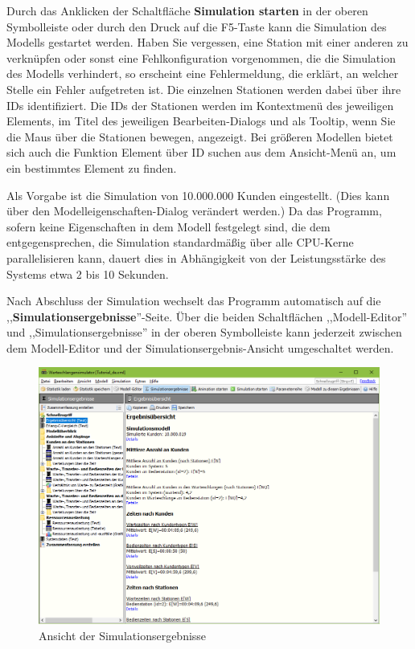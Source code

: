 \documentclass[deutsch]{svmono}
\begin{document}
Durch das Anklicken der Schaltfläche \textbf{Simulation starten} in der oberen Symbolleiste oder durch den Druck auf die F5-Taste kann die Simulation des Modells gestartet werden. Haben Sie vergessen, eine Station mit einer anderen zu verknüpfen oder sonst eine Fehlkonfiguration vorgenommen, die die Simulation des Modells verhindert, so erscheint eine Fehlermeldung, die erklärt, an welcher Stelle ein Fehler aufgetreten ist. Die einzelnen Stationen werden dabei über ihre IDs identifiziert. Die IDs der Stationen werden im Kontextmenü des jeweiligen Elements, im Titel des jeweiligen Bearbeiten-Dialogs und als Tooltip, wenn Sie die Maus über die Stationen bewegen, angezeigt. Bei größeren Modellen bietet sich auch die Funktion Element über ID suchen aus dem Ansicht-Menü an, um ein bestimmtes Element zu finden.

Als Vorgabe ist die Simulation von 10.000.000 Kunden eingestellt. (Dies kann über den Modell\-eigenschaften-Dialog verändert werden.) Da das Programm, sofern keine Eigenschaften in dem Modell festgelegt sind, die dem entgegensprechen, die Simulation standardmäßig über alle CPU-Kerne parallelisieren kann, dauert dies in Abhängigkeit von der Leistungsstärke des Systems etwa 2 bis 10 Sekunden.

Nach Abschluss der Simulation wechselt das Programm automatisch auf die ,,\textbf{Simulationsergebnisse}''-Seite. Über die beiden Schaltflächen ,,Modell-Editor'' und ,,Simulationsergebnisse'' in der oberen Symbolleiste kann jederzeit zwischen dem Modell-Editor und der Simulationsergebnis-Ansicht umgeschaltet werden.

\begin{figure}[H]	
	\caption{Ansicht der Simulationsergebnisse}
	\centerline{\includegraphics[width=14cm]{ProgramWindowResults.png}}
	\label{fig:ProgramWindowResults}
\end{figure} 
\end{document}
